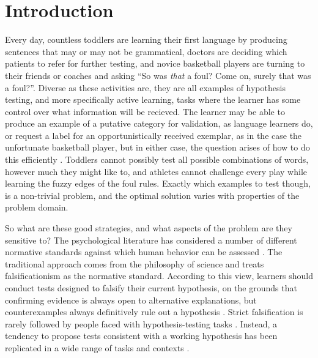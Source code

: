 \documentclass[10pt,letterpaper]{article}
\begin{document}
\section*{Introduction}
Every day, countless toddlers are learning their first language by producing sentences that may or may not be grammatical, doctors are deciding which patients to refer for further testing, and novice basketball players are turning to their friends or coaches and asking ``So was \textit{that} a foul? Come on, surely that was a foul?''. Diverse as these activities are, they are all examples of hypothesis testing, and more specifically active learning, tasks where the learner has some control over what information will be recieved. The learner may be able to produce an example of a putative category for validation, as language learners do, or request a label for an opportunistically received exemplar, as in the case the unfortunate basketball player, but in either case, the question arises of how to do this efficiently \cite{settles09activelearnlitrev,gureckis2012selfdirectedlearning}. Toddlers cannot possibly test all possible combinations of words, however much they might like to, and athletes cannot challenge every play while learning the fuzzy edges of the foul rules. Exactly which examples to test though, is a non-trivial problem, and the optimal solution varies with properties of the problem domain.

So what are these good strategies, and what aspects of the problem are they sensitive to? The psychological literature has considered a number of different normative standards against which human behavior can be assessed \cite{nelson2005usefulquestions}. The traditional approach comes from the philosophy of science and treats falsificationism as the normative standard. According to this view, learners should conduct tests designed to falsify their current hypothesis, on the grounds that confirming evidence is always open to alternative explanations, but counterexamples always definitively rule out a hypothesis \cite{popper1959scidiscovery}. Strict falsification is rarely followed by people faced with hypothesis-testing tasks \cite{wason1960failure,wason1968secondlook}. Instead, a tendency to propose tests consistent with a working hypothesis has been replicated in a wide range of tasks and contexts \cite{nickerson1998confirmation}. 
\end{document}
